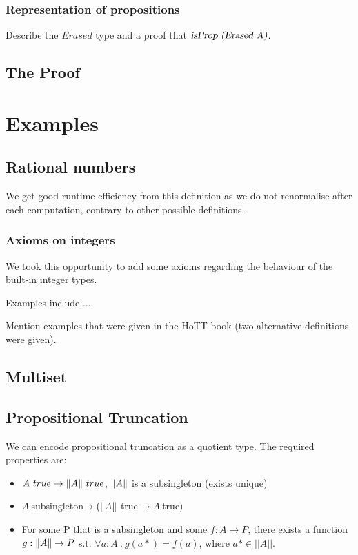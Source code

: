 \documentclass[11pt]{article}
\DeclarePairedDelimiter{\norm}{\lVert}{\rVert}
\newcommand \id[1] {\textsl{#1}}
\begin{document}
\subsubsection{Representation of propositions}
Describe the $Erased$ type and a proof that $\id{isProp (Erased A)}$.

\subsection{The Proof}

\section{Examples}
\subsection{Rational numbers}
We get good runtime efficiency from this definition as we do not renormalise after each computation, contrary to other possible definitions.

\subsubsection{Axioms on integers}

We took this opportunity to add some axioms regarding the behaviour of the built-in integer types. 

Examples include $\ldots$

Mention examples that were given in the HoTT book (two alternative definitions were given).

\subsection{Multiset}
\subsection{Propositional Truncation}

We can encode propositional truncation as a quotient type. The required properties are:

\begin{itemize}
	\item $A \ true \rightarrow \norm{A} \ true$, $\norm{A}$ is a subsingleton (exists unique)
	\item $A  \ $subsingleton$ \rightarrow (\norm{A} \ $true$ \rightarrow A \ $true$)$
	\item For some P that is a subsingleton and some $f :  A \rightarrow P$, there exists a function $g : \norm{A} \rightarrow P$ s.t. $ \forall a : A \ . \ g(a*) = f(a)$, where $ a* \in ||A||$.
\end{itemize}
\end{document}
